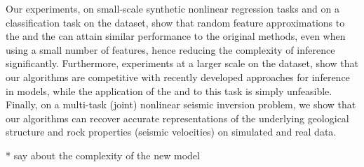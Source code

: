 Our experiments, on small-scale synthetic nonlinear regression tasks and on 
a classification task on the \usps dataset, show that random feature approximations to the 
\egp and the \ugp can attain similar performance to the original methods, 
even when using a small number of features, hence reducing the complexity 
of inference significantly. Furthermore, experiments at a larger scale on 
the \mnist dataset, show that our algorithms are competitive with recently developed 
approaches for inference in \gp models, while the application of the \egp and \ugp to
this task is simply unfeasible. Finally, on a multi-task (joint) nonlinear seismic inversion  problem,
we show that our algorithms can recover accurate representations of the underlying 
geological structure and rock properties (seismic velocities) on simulated and real data.



* say about the complexity of the new model 














